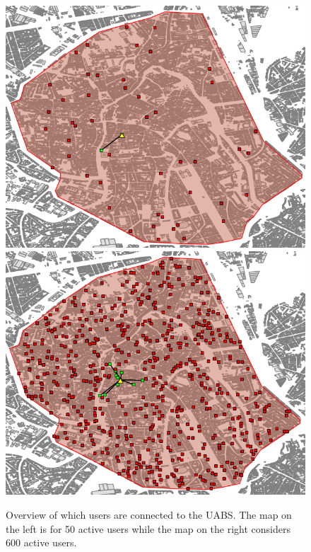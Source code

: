 \documentclass[twocolumn]{phdsymp} %
\begin{document}
\begin{figure}[!htb]
  \includegraphics[width=\linewidth]{../images/connectionsMap50Users.png}
\endminipage\hfill
{}%
  \includegraphics[width=\linewidth]{../images/connectionsMap600Users.png}
\endminipage
  \caption{Overview of which users are connected to the \gls{UABS}. The map on the left is for 50 active users while the map on the right considers 600 active users.}
  \label{fig:connectionMap}
\end{figure}
\end{document}

